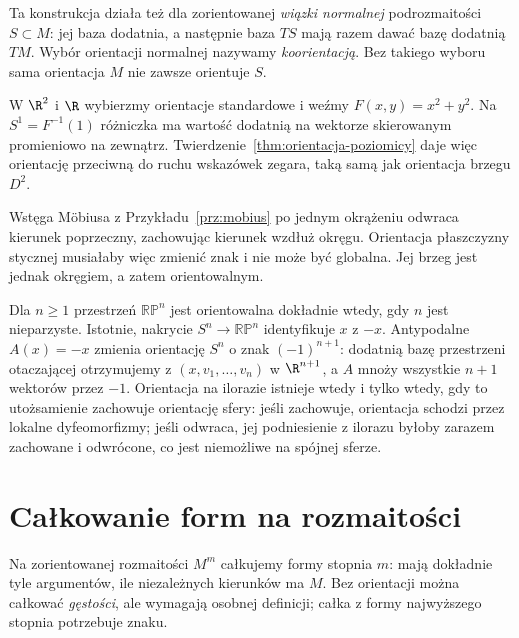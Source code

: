 Ta konstrukcja działa też dla zorientowanej
\emph{wiązki normalnej} podrozmaitości $S\subset M$:
jej baza dodatnia, a następnie baza $TS$ mają razem
dawać bazę dodatnią $TM$. Wybór orientacji normalnej
nazywamy \emph{koorientacją}. Bez takiego wyboru sama
orientacja $M$ nie zawsze orientuje $S$.

\begin{przyklad}
W $\R^2$ i $\R$ wybierzmy orientacje standardowe
i weźmy $F(x,y)=x^2+y^2$. Na $S^1=F^{-1}(1)$
różniczka ma wartość dodatnią na wektorze
skierowanym promieniowo na zewnątrz.
Twierdzenie~\ref{thm:orientacja-poziomicy} daje więc
orientację przeciwną do ruchu wskazówek zegara,
taką samą jak orientacja brzegu $D^2$.
\end{przyklad}

\begin{przyklad}
Wstęga Möbiusa z Przykładu~\ref{prz:mobius}
po jednym okrążeniu odwraca
kierunek poprzeczny, zachowując kierunek
wzdłuż okręgu. Orientacja płaszczyzny stycznej
musiałaby więc zmienić znak i nie może być globalna.
Jej brzeg jest jednak okręgiem, a zatem orientowalnym.

Dla $n\geq1$ przestrzeń $\mathbb{RP}^n$ jest
orientowalna dokładnie wtedy, gdy $n$ jest nieparzyste.
Istotnie, nakrycie $S^n\to\mathbb{RP}^n$ identyfikuje
$x$ z $-x$. Antypodalne $A(x)=-x$ zmienia orientację
$S^n$ o znak $(-1)^{n+1}$: dodatnią bazę przestrzeni otaczającej
otrzymujemy z $(x,v_1,\ldots,v_n)$ w $\R^{n+1}$,
a $A$ mnoży wszystkie $n+1$ wektorów przez $-1$.
Orientacja na ilorazie istnieje wtedy i tylko wtedy,
gdy to utożsamienie zachowuje orientację sfery:
jeśli zachowuje, orientacja schodzi przez lokalne
dyfeomorfizmy; jeśli odwraca, jej podniesienie z
ilorazu byłoby zarazem zachowane i odwrócone, co
jest niemożliwe na spójnej sferze.
\end{przyklad}
\section{Całkowanie form na rozmaitości}
\label{sec:formy-calkowanie}

Na zorientowanej rozmaitości $M^m$ całkujemy formy
stopnia $m$: mają dokładnie tyle argumentów, ile
niezależnych kierunków ma $M$. Bez orientacji można
całkować \emph{gęstości}, ale wymagają osobnej definicji;
całka z formy najwyższego stopnia potrzebuje znaku.

